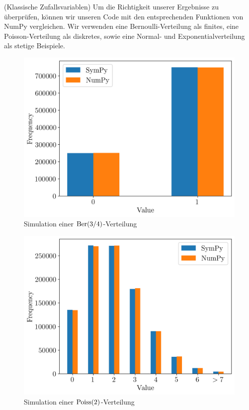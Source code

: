 \begin{Beispiel}{(Klassische Zufallsvariablen)}
Um die Richtigkeit unserer Ergebnisse zu \glqq überprüfen\grqq{}, können wir unseren Code mit den entsprechenden Funktionen von NumPy vergleichen. Wir verwenden eine Bernoulli-Verteilung als finites, eine Poisson-Verteilung als diskretes, sowie eine Normal- und Exponentialverteilung als stetige Beispiele.\\
\begin{minipage}{0.5\linewidth}
\begin{figure}[H]
\begin{center}
\includegraphics[width=\linewidth]{./Section/Simulation/Sim Bernoulli.png}
\caption{Simulation einer $\operatorname{Ber}(3/4)$-Verteilung}
\end{center}
\end{figure}
\end{minipage}
\begin{minipage}{0.5\linewidth}
\begin{figure}[H]
\begin{center}
\includegraphics[width=\linewidth]{./Section/Simulation/Sim Poisson.png}
\caption{Simulation einer $\operatorname{Poiss}(2)$-Verteilung}
\end{center}
\end{figure}
\end{minipage}


\end{Beispiel}
